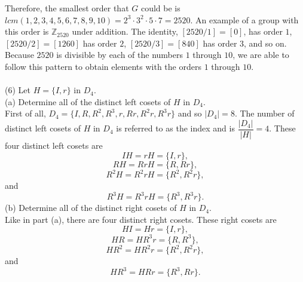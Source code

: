 \documentclass[11pt,a4paper]{article}
\begin{document}
Therefore, the smallest order that $G$ could be is $lcm(1,2,3,4,5,6,7,8,9,10) = 2^3\cdot 3^2\cdot 5 \cdot 7 = 2520$. An example of a group with this order is $\mathbb{Z}_{2520}$ under addition. The identity, $[2520/1] = [0]$, has order $1$, $[2520/2] = [1260]$ has order $2$,  $[2520/3] = [840]$ has order $3$, and so on. Because $2520$ is divisible by each of the numbers $1$ through $10$, we are able to follow this pattern to obtain elements with the orders $1$ through $10$.\\
~\\
(6) Let $H = \{I, r\}$ in $D_4$.\\
(a) Determine all of the distinct left cosets of $H$ in $D_4$.\\
First of all, $D_4 = \{I, R, R^2, R^3, r, Rr, R^2r, R^3r\}$ and so $|D_4| = 8$. The number of distinct left cosets of $H$ in $D_4$ is referred to as the index and is $\dfrac{|D_4|}{|H|} = 4$. These four distinct left cosets are
\[IH = rH = \{I, r\},\] 
\[RH = RrH = \{R, Rr\},\]
\[R^2H = R^2rH = \{R^2, R^2r\},\]
and
\[R^3H = R^3rH = \{R^3, R^3r\}.\]
(b) Determine all of the distinct right cosets of $H$ in $D_4$.\\
Like in part (a), there are four distinct right cosets. These right cosets are
\[HI = Hr = \{I,r\},\]
\[HR = HR^3r = \{R,R^3\},\]
\[HR^2 = HR^2r = \{R^2, R^2r\},\]
and
\[HR^3 = HRr = \{R^3,Rr\}.\]
\end{document}
